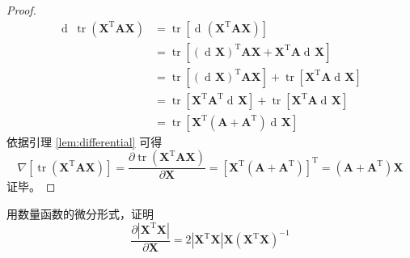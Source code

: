 \documentclass[UTF8,space=auto]{ctexart} %
\DeclareMathOperator{\diff}{d\!}
\begin{document}
\begin{proof}
\begin{align*}
	\diff\,\operatorname{tr}\left(\mathbf{X}^{\mathrm{T}} \mathbf{A} \mathbf{X}\right) &= \operatorname{tr}\left[ \diff\left( \mathbf{X}^{\mathrm{T}} \mathbf{A} \mathbf{X} \right) \right] \\
	&= \operatorname{tr}\left[ (\diff\mathbf{X})^{\mathrm{T}}\mathbf{AX} + \mathbf{X}^{\mathrm{T}} \mathbf{A} \diff\mathbf{X} \right] \\
	&= \operatorname{tr}\left[ (\diff\mathbf{X})^{\mathrm{T}}\mathbf{AX} \right] + \operatorname{tr}\left[ \mathbf{X}^{\mathrm{T}} \mathbf{A} \diff\mathbf{X} \right] \\
	&= \operatorname{tr}\left[ \mathbf{X}^{\mathrm{T}} \mathbf{A}^{\mathrm{T}} \diff\mathbf{X} \right] + \operatorname{tr}\left[ \mathbf{X}^{\mathrm{T}} \mathbf{A} \diff\mathbf{X} \right] \\
	&= \operatorname{tr}\left[ \mathbf{X}^{\mathrm{T}} \left( \mathbf{A} + \mathbf{A}^{\mathrm{T}} \right) \diff\mathbf{X} \right]
\end{align*}
依据引理 \ref{lem:differential} 可得
\[
\nabla\left[ \operatorname{tr}\left(\mathbf{X}^{\mathrm{T}} \mathbf{A} \mathbf{X}\right) \right] = \frac{\partial \operatorname{tr}\left(\mathbf{X}^{\mathrm{T}} \mathbf{A} \mathbf{X}\right)}{\partial \mathbf{X}} = \left[ \mathbf{X}^{\mathrm{T}} \left( \mathbf{A} + \mathbf{A}^{\mathrm{T}} \right) \right]^{\mathrm{T}} = \left( \mathbf{A} + \mathbf{A}^{\mathrm{T}} \right) \mathbf{X}
\]
证毕。
\end{proof}

\begin{exam}
用数量函数的微分形式，证明
\[
\frac{\partial\left|\mathbf{X}^{\mathrm{T}} \mathbf{X}\right|}{\partial \mathbf{X}}=2\left|\mathbf{X}^{\mathrm{T}} \mathbf{X}\right| \mathbf{X}\left(\mathbf{X}^{\mathrm{T}} \mathbf{X}\right)^{-1}
\]
\end{exam}
\end{document}
